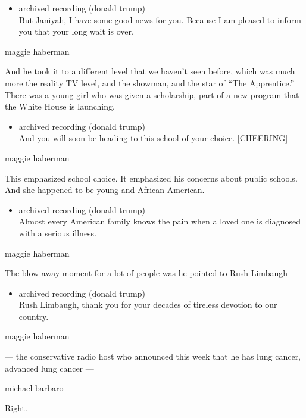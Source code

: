 \begin{itemize}
\tightlist
\item
  archived recording (donald trump)\\
  But Janiyah, I have some good news for you. Because I am pleased to
  inform you that your long wait is over.
\end{itemize}

maggie haberman

And he took it to a different level that we haven't seen before, which
was much more the reality TV level, and the showman, and the star of
``The Apprentice.'' There was a young girl who was given a scholarship,
part of a new program that the White House is launching.

\begin{itemize}
\tightlist
\item
  archived recording (donald trump)\\
  And you will soon be heading to this school of your choice.
  {[}CHEERING{]}
\end{itemize}

maggie haberman

This emphasized school choice. It emphasized his concerns about public
schools. And she happened to be young and African-American.

\begin{itemize}
\tightlist
\item
  archived recording (donald trump)\\
  Almost every American family knows the pain when a loved one is
  diagnosed with a serious illness.
\end{itemize}

maggie haberman

The blow away moment for a lot of people was he pointed to Rush Limbaugh
---

\begin{itemize}
\tightlist
\item
  archived recording (donald trump)\\
  Rush Limbaugh, thank you for your decades of tireless devotion to our
  country.
\end{itemize}

maggie haberman

--- the conservative radio host who announced this week that he has lung
cancer, advanced lung cancer ---

michael barbaro

Right.

